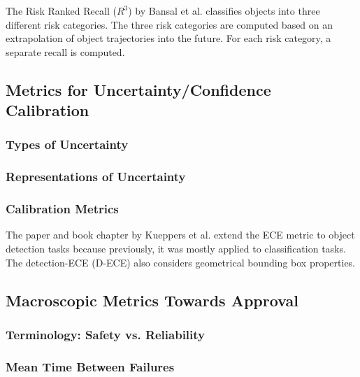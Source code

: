 \documentclass[conference]{IEEEtran}
\begin{document}
The Risk Ranked Recall ($R^3$) by Bansal et al. \cite{Bansal2021riskrankedrecall} classifies objects into three different risk categories.
The three risk categories are computed based on an extrapolation of object trajectories into the future. 
For each risk category, a separate recall is computed. 



\subsection{Metrics for Uncertainty/Confidence Calibration}
\label{sec:self_reporting_metrics}

\subsubsection{Types of Uncertainty}
\label{sec:uncertainty_forms}

\subsubsection{Representations of Uncertainty}
\label{sec:uncertainty_representations}

\subsubsection{Calibration Metrics}
\label{sec:uncertainty_metrics_detail}

The paper \cite{Kueppers2020confidence} and book chapter \cite{Kueppers2022confidence} by Kueppers et al. extend the ECE metric to object detection tasks because previously, it was mostly applied to classification tasks. The detection-ECE (D-ECE) also considers geometrical bounding box properties. 

\subsection{Macroscopic Metrics Towards Approval} 
\label{sec:safety_metrics_macro}

\subsubsection{Terminology: Safety vs. Reliability}

\subsubsection{Mean Time Between Failures}
\end{document}
